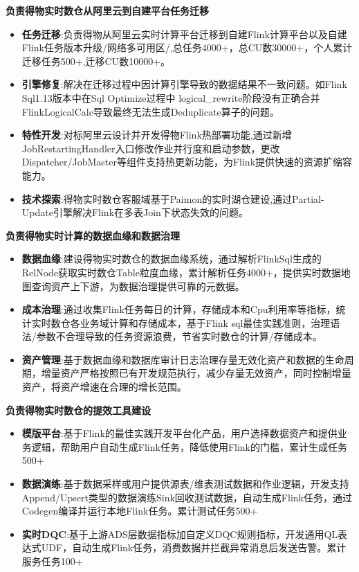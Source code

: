 \documentclass{resume}
\begin{document}
\textbf{负责得物实时数仓从阿里云到自建平台任务迁移}
\begin{itemize}
  \item \textbf{任务迁移}:负责得物从阿里云实时计算平台迁移到自建Flink计算平台以及自建Flink任务版本升级/网络多可用区/,总任务4000+，总CU数30000+，个人累计迁移任务500+,迁移CU数10000+。
  \item \textbf{引擎修复}:解决在迁移过程中因计算引擎导致的数据结果不一致问题。如Flink Sql1.13版本中在Sql Optimize过程中 logical\_rewrite阶段没有正确合并FlinkLogicalCalc导致最终无法生成Deduplicate算子的问题。
  \item \textbf{特性开发}:对标阿里云设计并开发得物Flink热部署功能,通过新增JobRestartingHandler入口修改作业并行度和启动参数，更改Dispatcher/JobMaster等组件支持热更新功能，为Flink提供快速的资源扩缩容能力。
  \item \textbf{技术探索}:得物实时数仓客服域基于Paimon的实时湖仓建设,通过Partial-Update引擎解决Flink在多表Join下状态失效的问题。
\end{itemize}

\textbf{负责得物实时计算的数据血缘和数据治理}
\begin{itemize}
  \item \textbf{数据血缘}:建设得物实时数仓的数据血缘系统，通过解析FlinkSql生成的RelNode获取实时数仓Table粒度血缘，累计解析任务4000+，提供实时数据地图查询资产上下游，为数据治理提供可靠的元数据。
  \item \textbf{成本治理}:通过收集Flink任务每日的计算，存储成本和Cpu利用率等指标，统计实时数仓各业务域计算和存储成本，基于Flink sql最佳实践准则，治理语法/参数不合理导致的任务资源浪费，节省实时数仓的计算/存储成本。
  \item \textbf{资产管理}:基于数据血缘和数据库审计日志治理存量无效化资产和数据的生命周期，增量资产严格按照已有开发规范执行，减少存量无效资产，同时控制增量资产，将资产增速在合理的增长范围。
\end{itemize}

\textbf{负责得物实时数仓的提效工具建设}
\begin{itemize}
  \item \textbf{模版平台}:基于Flink的最佳实践开发平台化产品，用户选择数据资产和提供业务逻辑，帮助用户自动生成Flink任务，降低使用Flink的门槛，累计生成任务500+
  \item \textbf{数据演练}:基于数据采样或用户提供源表/维表测试数据和作业逻辑，开发支持Append/Upsert类型的数据演练Sink回收测试数据，自动生成Flink任务，通过Codegen编译并运行本地Flink任务。累计测试任务500+
  \item \textbf{实时DQC}:基于上游ADS层数据指标加自定义DQC规则指标，开发通用QL表达式UDF，自动生成Flink任务，消费数据并拦截异常消息后发送告警。累计服务任务100+
\end{itemize}
\end{document}
